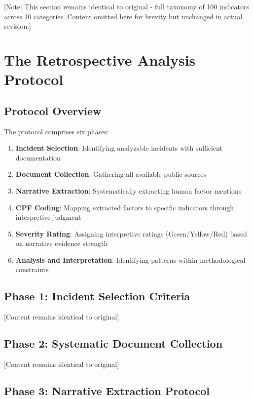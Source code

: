 \documentclass[11pt,a4paper]{article}
\begin{document}
[Note: This section remains identical to original - full taxonomy of 100 indicators across 10 categories. Content omitted here for brevity but unchanged in actual revision.]

\section{The Retrospective Analysis Protocol}

\subsection{Protocol Overview}

The protocol comprises six phases:

\begin{enumerate}
\item \textbf{Incident Selection}: Identifying analyzable incidents with sufficient documentation
\item \textbf{Document Collection}: Gathering all available public sources
\item \textbf{Narrative Extraction}: Systematically extracting human factor mentions
\item \textbf{CPF Coding}: Mapping extracted factors to specific indicators through interpretive judgment
\item \textbf{Severity Rating}: Assigning interpretive ratings (Green/Yellow/Red) based on narrative evidence strength
\item \textbf{Analysis and Interpretation}: Identifying patterns within methodological constraints
\end{enumerate}

\subsection{Phase 1: Incident Selection Criteria}

[Content remains identical to original]

\subsection{Phase 2: Systematic Document Collection}

[Content remains identical to original]

\subsection{Phase 3: Narrative Extraction Protocol}
\end{document}
